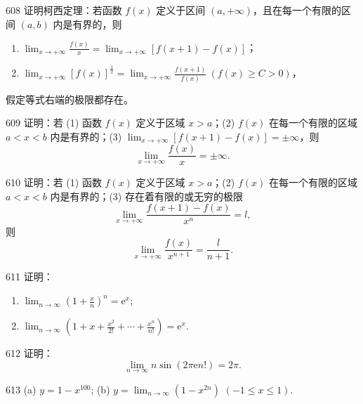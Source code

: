 \begin{prob}[L]{608}
证明柯西定理：若函数 $f(x)$ 定义于区间 $(a, +\infty)$，且在每一个有限的区间 $(a, b)$ 内是有界的，则
\begin{enumerate}[label=(\alph*), itemsep=2pt, topsep=3pt]
  \item $\displaystyle \lim_{x\to +\infty} \frac{f(x)}{x} = \lim_{x\to +\infty} [f(x+1) - f(x)]$；
  \item $\displaystyle \lim_{x\to +\infty} [f(x)]^{\frac{1}{x}} = \lim_{x\to +\infty} \frac{f(x+1)}{f(x)} \ (f(x) \geqslant C > 0)$，
\end{enumerate}
假定等式右端的极限都存在。
\end{prob}

\begin{prob}[M]{609}
证明：若 (1) 函数 $f(x)$ 定义于区域 $x > a$；(2) $f(x)$ 在每一个有限的区域 $a < x < b$ 内是有界的；(3) $\lim_{x\to +\infty} [f(x+1) - f(x)] = \pm\infty$，则
\[
\lim_{x\to +\infty} \frac{f(x)}{x} = \pm\infty.
\]
\end{prob}

\begin{prob}[M]{610}
证明：若 (1) 函数 $f(x)$ 定义于区域 $x > a$；(2) $f(x)$ 在每一个有限的区域 $a < x < b$ 内是有界的；(3) 存在着有限的或无穷的极限
\[
\lim_{x \to +\infty} \frac{f(x+1) - f(x)}{x^n} = l,
\]
则
\[
\lim_{x \to +\infty} \frac{f(x)}{x^{n+1}} = \frac{l}{n+1}.
\]
\end{prob}

\begin{prob}[M]{611}
证明：
\begin{enumerate}[label=(\alph*), itemsep=2pt, topsep=3pt]
\item $\lim_{n \to \infty} \left(1 + \frac{x}{n}\right)^n = \mathrm{e}^x$;
\item $\lim_{n \to \infty} \left(1 + x + \frac{x^2}{2!} + \cdots + \frac{x^n}{n!}\right) = \mathrm{e}^x$.
\end{enumerate}
\end{prob}

\begin{prob}[M]{612}
证明：
\[
\lim_{n \to \infty} n\sin(2\pi \mathrm{e} n!) = 2\pi.
\]
\end{prob}


\begin{prob}[M]{613}
(a) $y = 1 - x^{100}$; \qquad (b) $y = \lim_{n \to \infty} (1 - x^{2n})$ $(-1 \leqslant x \leqslant 1)$.
\end{prob}

